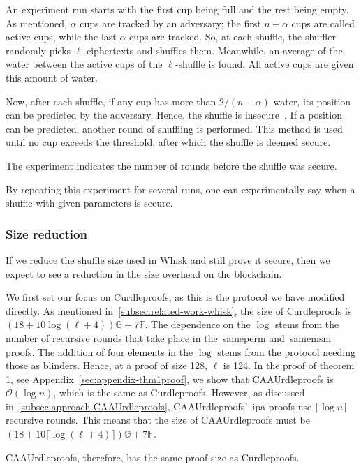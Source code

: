 An experiment run starts with the first cup being full and the rest being empty.
As mentioned, $\alpha$ cups are tracked by an adversary; the first $n-\alpha$ cups are called active cups, while the last $\alpha$ cups are tracked.
So, at each shuffle, the shuffler randomly picks $\ell$ ciphertexts and shuffles them.
Meanwhile, an average of the water between the active cups of the $\ell$-shuffle is found.
All active cups are given this amount of water.

Now, after each shuffle, if any cup has more than $2/(n-\alpha)$ water, its position can be predicted by the adversary.
Hence, the shuffle is insecure~\cite{cryptoeprint:2022/560}.
If a position can be predicted, another round of shuffling is performed.
This method is used until no cup exceeds the threshold, after which the shuffle is deemed secure.

The experiment indicates the number of rounds before the shuffle was secure.

By repeating this experiment for several runs, one can experimentally say when a shuffle with given parameters is secure.

\subsubsection{Size reduction}
If we reduce the shuffle size used in Whisk and still prove it secure, then we expect to see a reduction in the size overhead on the blockchain.

We first set our focus on Curdleproofs, as this is the protocol we have modified directly.
As mentioned in~\autoref{subsec:related-work-whisk}, the size of Curdleproofs is $(18+10 \log(\ell+4))\mathbb{G}+7\mathbb{F}$.
The dependence on the $\log$ stems from the number of recursive rounds that take place in the~\gls{sameperm} and~\gls{samemsm} proofs.
The addition of four elements in the $\log$ stems from the protocol needing those as blinders.
Hence, at a proof of size 128, $\ell$ is 124.
In the proof of theorem 1, see Appendix~\ref{sec:appendix-thm1proof}, we show that CAAUrdleproofs is $\mathcal{O}(\log n)$, which is the same as Curdleproofs.
However, as discussed in~\autoref{subsec:approach-CAAUrdleproofs}, CAAUrdleproofs'~\gls{ipa} proofs use $\lceil \log n \rceil$ recursive rounds.
This means that the size of CAAUrdleproofs must be $(18+10 \lceil\log(\ell+4)\rceil)\mathbb{G}+7\mathbb{F}$.

CAAUrdleproofs, therefore, has the same proof size as Curdleproofs.

